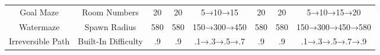\begin{table}[t!]
{\begin{tabular}{@{}c|c|c|ccccc@{}}
Goal Maze                                                                      & Room Numbers                                                                             & 20                                                                                  & 20                                                                 & 5→10→15                                                          & 20                                                          & 20                                                    & 5→10→15→20                                                       \\
Watermaze                                                                      & Spawn Radius                                                                             & 580                                                                                 & 580                                                                & 150→300→450                                                      & 580                                                         & 580                                                   & 150→300→450→580                                                  \\
Irreversible Path                                                              & Built-In Difficulty                                                                      & .9                                                                                  & .9                                                                 & .1→.3→.5→.7                                                      & .9                                                          & .9                                                    & .1→.3→.5→.7→.9                                                   \\ \bottomrule
\end{tabular}

}
\end{table}
